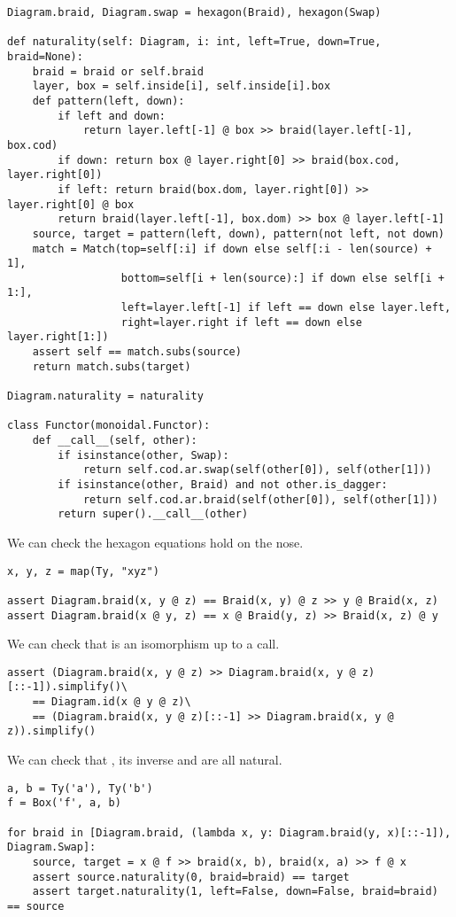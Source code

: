 \begin{python}
\begin{verbatim}
Diagram.braid, Diagram.swap = hexagon(Braid), hexagon(Swap)

def naturality(self: Diagram, i: int, left=True, down=True, braid=None):
    braid = braid or self.braid
    layer, box = self.inside[i], self.inside[i].box
    def pattern(left, down):
        if left and down:
            return layer.left[-1] @ box >> braid(layer.left[-1], box.cod)
        if down: return box @ layer.right[0] >> braid(box.cod, layer.right[0])
        if left: return braid(box.dom, layer.right[0]) >> layer.right[0] @ box
        return braid(layer.left[-1], box.dom) >> box @ layer.left[-1]
    source, target = pattern(left, down), pattern(not left, not down)
    match = Match(top=self[:i] if down else self[:i - len(source) + 1],
                  bottom=self[i + len(source):] if down else self[i + 1:],
                  left=layer.left[-1] if left == down else layer.left,
                  right=layer.right if left == down else layer.right[1:])
    assert self == match.subs(source)
    return match.subs(target)

Diagram.naturality = naturality

class Functor(monoidal.Functor):
    def __call__(self, other):
        if isinstance(other, Swap):
            return self.cod.ar.swap(self(other[0]), self(other[1]))
        if isinstance(other, Braid) and not other.is_dagger:
            return self.cod.ar.braid(self(other[0]), self(other[1]))
        return super().__call__(other)
\end{verbatim}
\end{python}

\begin{example}
We can check the hexagon equations hold on the nose.

\begin{verbatim}
x, y, z = map(Ty, "xyz")

assert Diagram.braid(x, y @ z) == Braid(x, y) @ z >> y @ Braid(x, z)
assert Diagram.braid(x @ y, z) == x @ Braid(y, z) >> Braid(x, z) @ y
\end{verbatim}

We can check that  is an isomorphism up to a  call.

\begin{verbatim}
assert (Diagram.braid(x, y @ z) >> Diagram.braid(x, y @ z)[::-1]).simplify()\
    == Diagram.id(x @ y @ z)\
    == (Diagram.braid(x, y @ z)[::-1] >> Diagram.braid(x, y @ z)).simplify()
\end{verbatim}

We can check that , its inverse and  are all natural.

\begin{verbatim}
a, b = Ty('a'), Ty('b')
f = Box('f', a, b)

for braid in [Diagram.braid, (lambda x, y: Diagram.braid(y, x)[::-1]), Diagram.Swap]:
    source, target = x @ f >> braid(x, b), braid(x, a) >> f @ x
    assert source.naturality(0, braid=braid) == target
    assert target.naturality(1, left=False, down=False, braid=braid) == source
\end{verbatim}
\end{example}

